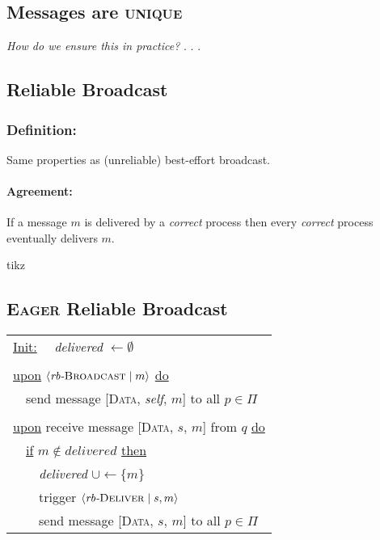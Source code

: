 \documentclass{article}
\begin{document}
\begin{adjustwidth}{2em}{2em}
		\subsection{Messages are \textsc{unique}}
		\begin{adjustwidth}{2em}{2em}
			\textit{How do we ensure this in practice?}
			.
			.
			.
		\end{adjustwidth}
		\subsection{Reliable Broadcast}
		\begin{adjustwidth}{2em}{2em}
			\subsubsection{Definition:}
			\begin{adjustwidth}{2em}{}
				Same properties as (unreliable) best-effort broadcast.
				\paragraph{Agreement:}
				\begin{adjustwidth}{1em}{}
					If a message $m$ is delivered by a \textit{correct} process then every \textit{correct} process eventually delivers $m$. \\
					\begin{center}
						tikz
					\end{center}
				\end{adjustwidth}
			\end{adjustwidth}
		\end{adjustwidth}
		\subsection{\textsc{Eager} Reliable Broadcast}
		\begin{center}
			\begin{tabular}{l}
				\underline{Init:}
				\ \ \textit{delivered} $\leftarrow \emptyset$ \\
				\\
				\underline{upon} $\langle \textit{rb-}\textsc{Broadcast} \mid m \rangle$ \underline{do} \\
				\ \ send message [\textsc{Data}, \textit{self}, $m$] to all $p \in \Pi$ \\
				\\
				\underline{upon} receive message [\textsc{Data}, $s$, $m$] from $q$ \underline{do} \\
				\ \ \underline{if} $m \not\in \textit{delivered}$ \underline{then} \\
				\ \ \ \ \textit{delivered} $\cup \leftarrow \{ m \}$ \\
				\ \ \ \ trigger $\langle \textit{rb-}\textsc{Deliver} \mid s, m \rangle$ \\
				\ \ \ \ send message [\textsc{Data}, $s$, $m$] to all $p \in \Pi$
			\end{tabular}
		\end{center}
		\begin{adjustwidth}{2em}{2em}

\end{adjustwidth}
\end{adjustwidth}
\end{document}
